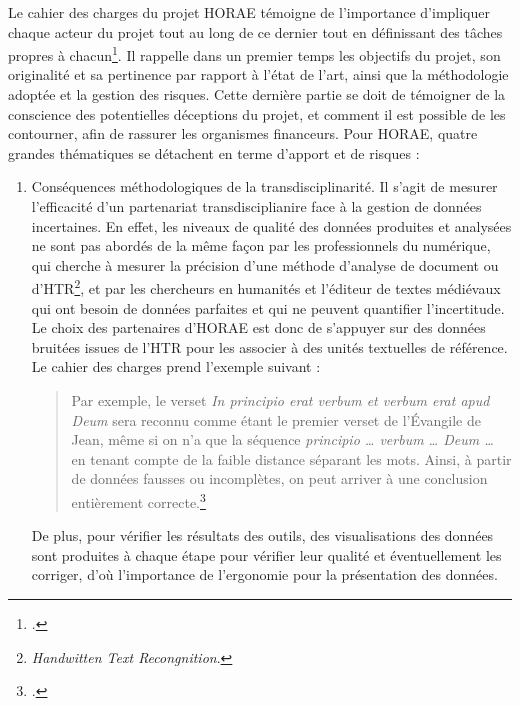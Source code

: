 \documentclass[a4paper,12pt,twoside]{book}
\begin{document}
	Le cahier des charges du projet HORAE témoigne de l'importance d'impliquer chaque acteur du projet tout au long de ce dernier tout en définissant des tâches propres à chacun\footcite{HORAE_projet}.  Il rappelle dans un premier temps les objectifs du projet, son originalité et sa pertinence par rapport à l'état de l'art, ainsi que la méthodologie adoptée et la gestion des risques. Cette dernière partie se doit de témoigner de la conscience des potentielles déceptions du projet, et comment il est possible de les contourner, afin de rassurer les organismes financeurs. Pour HORAE, quatre grandes thématiques se détachent en terme d'apport et de risques : 
	\begin{enumerate}
	    \item \og Conséquences méthodologiques de la transdisciplinarité\fg{}. Il s'agit de mesurer l'efficacité d'un partenariat transdisciplianire face à la gestion de données incertaines. En effet, les niveaux de qualité des données produites et analysées ne sont pas abordés de la même façon par les professionnels du numérique, qui cherche à mesurer la précision d'une méthode d'analyse de document ou d'HTR\footnote{\textit{Handwitten Text Recongnition}.}, et par les chercheurs en humanités et l'éditeur de textes médiévaux qui ont besoin de données parfaites et qui ne peuvent quantifier l'incertitude. Le choix des partenaires d'HORAE est donc de s'appuyer sur des données \og bruitées\fg{} issues de l'HTR pour les associer à des unités textuelles de référence. Le cahier des charges prend l'exemple suivant : 
	    \begin{quote}
Par exemple, le verset \og \textit{In principio erat verbum et verbum erat apud Deum}\fg{} sera reconnu comme étant le premier verset de l’Évangile de Jean, même si on n’a que la séquence \og \textit{principio … verbum … Deum …}\fg{} en tenant compte de la faible distance séparant les mots. Ainsi, à partir de données fausses ou incomplètes, on peut arriver à une conclusion entièrement correcte.\footcite[p. 9]{HORAE_projet}
	    \end{quote}
	    De plus, pour vérifier les résultats des outils, des visualisations des données sont produites à chaque étape pour vérifier leur qualité et éventuellement les corriger, d'où l'importance de l'ergonomie pour la présentation des données. 

\end{enumerate}
\end{document}
